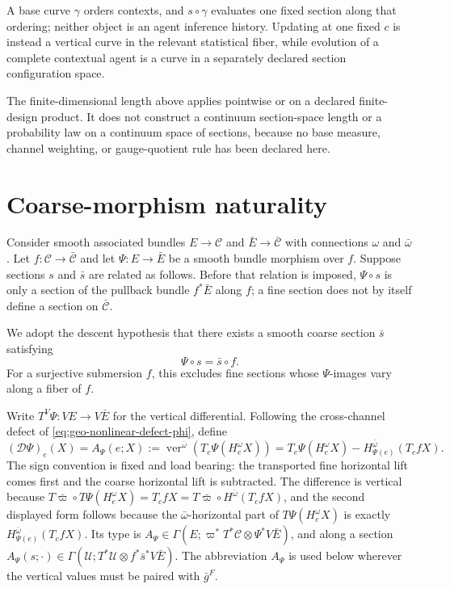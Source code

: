 A base curve $\gamma$ orders contexts, and $s\circ\gamma$ evaluates one fixed
section along that ordering; neither object is an agent inference history.
Updating at one fixed $c$ is instead a vertical curve in the relevant
statistical fiber, while evolution of a complete contextual agent is a curve
in a separately declared section configuration space.

The finite-dimensional length above applies pointwise or on a declared
finite-design product.  It does not construct a continuum section-space
length or a probability law on a continuum space of sections, because no base
measure, channel weighting, or gauge-quotient rule has been declared here.

\section{Coarse-morphism naturality}
\label{sec:pb-coarse-naturality}

Consider smooth associated bundles $E\to\mathcal C$ and
$\bar E\to\bar{\mathcal C}$ with connections $\omega$ and $\bar\omega$.
Let $f:\mathcal C\to\bar{\mathcal C}$ and let
$\Psi:E\to\bar E$ be a smooth bundle morphism over $f$.  Suppose sections
$s$ and $\bar s$ are related as follows.  Before that relation is imposed,
$\Psi\circ s$ is only a section of the pullback bundle $f^*\bar E$ along
$f$; a fine section does not by itself define a section on
$\bar{\mathcal C}$.  

We adopt the descent hypothesis that there exists a smooth coarse section
$\bar s$ satisfying
\begin{equation}
\Psi\circ s=\bar s\circ f.
\label{eq:pb-coarse-related-sections}
\end{equation}
For a surjective submersion $f$, this excludes fine sections whose
$\Psi$-images vary along a fiber of $f$. 

Write $T^V\Psi:VE\to V\bar E$ for the vertical differential. Following the
cross-channel defect of \eqref{eq:geo-nonlinear-defect-phi}, define
\begin{equation}
(\mathcal D\Psi)_e(X)
=A_\Psi(e;X)
:=\operatorname{ver}^{\bar\omega}
\left(T_e\Psi(H_e^\omega X)\right)
=T_e\Psi(H_e^\omega X)
-H_{\Psi(e)}^{\bar\omega}(T_cfX).
\label{eq:pb-coarse-horizontal-defect}
\end{equation}
The sign convention is fixed and load bearing: the transported fine horizontal
lift comes first and the coarse horizontal lift is subtracted.  The difference
is vertical because
$T\bar\varpi\circ T\Psi(H^\omega_eX)=T_cfX=T\bar\varpi\circ H^{\bar\omega}(T_cfX)$,
and the second displayed form follows because the $\bar\omega$-horizontal part
of $T\Psi(H^\omega_eX)$ is exactly $H^{\bar\omega}_{\Psi(e)}(T_cfX)$.  Its type
is
$A_\Psi\in\Gamma(E;\varpi^*T^*\mathcal C\otimes\Psi^*V\bar E)$, and along a
section
$A_\Psi(s;\cdot)\in\Gamma(\mathcal U;T^*\mathcal U\otimes f^*\bar s^*V\bar E)$.
The abbreviation $A_\Psi$ is used below wherever the vertical values must be
paired with $\bar g^F$.  

